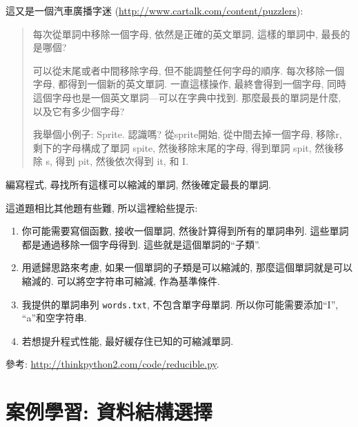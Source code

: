 \documentclass[10pt]{book}
\begin{document}
\begin{exercise}

這又是一個汽車廣播字迷
(\url{http://www.cartalk.com/content/puzzlers}):

\begin{quote}
每次從單詞中移除一個字母, 依然是正確的英文單詞, 這樣的單詞中, 
最長的是哪個?

可以從末尾或者中間移除字母, 但不能調整任何字母的順序. 
每次移除一個字母, 都得到一個新的英文單詞. 一直這樣操作, 
最終會得到一個字母, 同時這個字母也是一個英文單詞---可以在字典中找到. 
那麼最長的單詞是什麼, 以及它有多少個字母?

我舉個小例子: Sprite. 認識嗎? 從sprite開始, 從中間去掉一個字母, 移除r, 剩下的字母構成了單詞 spite, 
然後移除末尾的字母, 得到單詞 spit, 然後移除 s, 得到 pit, 然後依次得到 it, 和 I. 
\end{quote}

編寫程式, 尋找所有這樣可以縮減的單詞, 然後確定最長的單詞. 

這道題相比其他題有些難, 所以這裡給些提示:

\begin{enumerate}

\item 你可能需要寫個函數, 接收一個單詞, 然後計算得到所有的單詞串列. 
這些單詞都是通過移除一個字母得到. 這些就是這個單詞的``子類''.

\item 用遞歸思路來考慮, 如果一個單詞的子類是可以縮減的, 
那麼這個單詞就是可以縮減的. 可以將空字符串可縮減, 作為基準條件. 

\item 我提供的單詞串列 {\tt words.txt}, 不包含單字母單詞. 所以你可能需要添加``I'', ``a''和空字符串. 

\item 若想提升程式性能, 最好緩存住已知的可縮減單詞. 

\end{enumerate}

參考: \url{http://thinkpython2.com/code/reducible.py}.

\end{exercise}




\chapter{案例學習: 資料結構選擇}
\end{document}
